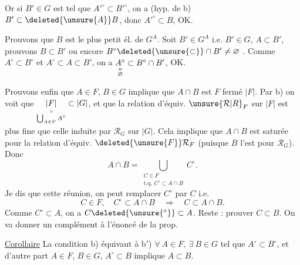 Or si $B'\in G$ est tel que $A'^\circ\subset B'^\circ$, on a  (hyp. de b) $B'\subset \deleted{\unsure{A}}B$, donc $A'^\circ\subset B$, OK.

Prouvons que $B$ est le plus petit él. de $G^A$. Soit $B'\in G^A$ i.e. $B'\in G$, $A\subset B'$, prouvons $B\subset B'$ ou encore $B^\circ\deleted{\unsure{\subset}}\cap B'\ne\varnothing$ . Comme
$A^\circ\subset B^\circ$ et $A^\circ\subset A\subset B'$, on a $\underset{\substack{\mathrel{\ooalign{\hfil$\scriptstyle\shortparallel$\hfil\cr\hfil$\scriptstyle-$\hfil\cr}}\\ \varnothing}}{A^\circ}\subset B^\circ\cap B'$, OK.

Prouvons enfin que $A\in F$, $B\in G$ implique que $A\cap B$ est $F$ fermé  $|F|$. Par b) on voit que $\underset{\substack{\shortparallel\\ \bigcup_{A\in F}A^\circ}}{|F|}\subset|G|$, et que
la relation d'équiv. $\unsure{\mathcal R|R}_F$ sur $|F|$ est plus fine que celle induite par $\mathcal R_G$ sur $|G|$. Cela implique que $A\cap B$ est saturée pour la relation d'équiv. $\deleted{\unsure{F}}\mathcal R_F$ (puisque $B$ l'est pour $\mathcal R_G$). Donc
\[ A\cap B=\bigcup_{\substack{C\in F\\ \text{t.q. } C^\circ\subset A\cap B}} C^\circ . \]
Je dis que  cette réunion,  on peut remplacer $C^\circ$ par $C$ i.e.
\[ C\in F,\quad C^\circ\subset A\cap B\quad\Longrightarrow\quad C\subset A\cap B. \]
Comme $C^\circ\subset A$, on a $C\deleted{\unsure{{}^\circ}}\subset A$. Reste : prouver $C\subset B$. On va donner un complément  à l'énoncé de la prop.

\uline{Corollaire} La condition b) équivaut à
$\mathrm{b}'$) $\forall\ A\in F,\ \exists\ B\in G$ tel que $A^\circ\subset B^\circ$, et d'autre part $A\in F$, $B\in G$, $A^\circ\subset B$ implique $A\subset B$.
